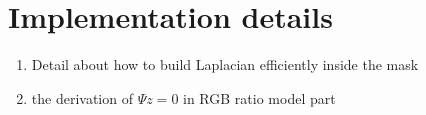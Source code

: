 \chapter{Implementation details}\label{appendix:implement}

\begin{enumerate}
    \item Detail about how to build Laplacian efficiently inside the mask
    \item the derivation of $\Psi z = 0$ in RGB ratio model part
\end{enumerate}
